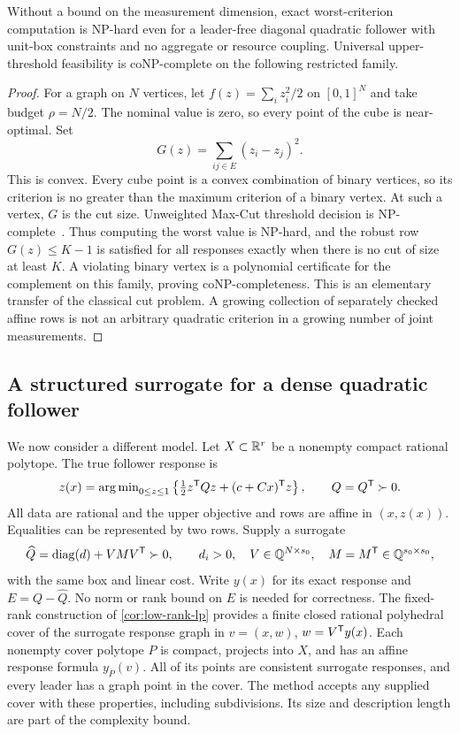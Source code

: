 \begin{proposition}
\label{prop:robust-measurement-hardness}
Without a bound on the measurement dimension, exact worst-criterion
computation is NP-hard even for a leader-free diagonal quadratic
follower with unit-box constraints and no aggregate or resource
coupling. Universal upper-threshold feasibility is coNP-complete on
the following restricted family.
\end{proposition}
\begin{proof}
For a graph on $N$ vertices, let $f(z)=\sum_i z_i^2/2$ on $[0,1]^N$
and take budget $\rho=N/2$. The nominal value is zero, so every point
of the cube is near-optimal. Set
\[
                         G(z)=\sum_{ij\in E}(z_i-z_j)^2.
\]
This is convex. Every cube point is a convex combination of binary
vertices, so its criterion is no greater than the maximum criterion of
a binary vertex. At such a vertex, $G$ is the cut size. Unweighted
Max-Cut threshold decision is NP-complete~\cite{GareyJohnsonStockmeyer1976}.
Thus computing the worst value is NP-hard, and the robust row
$G(z)\le K-1$ is satisfied for all responses exactly when there is no
cut of size at least $K$. A violating binary vertex is a polynomial
certificate for the complement on this family, proving coNP-completeness.
This is an elementary transfer of the classical cut problem. A growing
collection of separately checked affine rows is not an arbitrary
quadratic criterion in a growing number of joint measurements.
\end{proof}

\subsection{A structured surrogate for a dense quadratic follower}
\label{subsec:screening-model}

We now consider a different model. Let $X\subset\mathbb R^r$ be a nonempty
compact rational polytope. The true follower response is
\begin{equation}\label{eq:dense-screening-follower}
 z(x)=\operatorname{arg\,min}_{0\le z\le1}
          \left\{\tfrac12 z^{\mathsf T} Qz+(c+Cx)^{\mathsf T} z\right\},
                      \qquad Q=Q^{\mathsf T}\succ0.
\end{equation}
All data are rational and the upper objective and rows are affine in
$(x,z(x))$. Equalities can be represented by two rows. Supply a surrogate
\[
 \widehat Q=\operatorname{diag}(d)+VMV^{\mathsf T}\succ0,\qquad
 d_i>0,\quad V\in\mathbb Q^{N\times s_0},\quad M=M^{\mathsf T}\in\mathbb Q^{s_0\times s_0},
\]
with the same box and linear cost. Write $y(x)$ for its exact response
and $E=Q-\widehat Q$. No norm or rank bound on $E$ is needed for
correctness. The fixed-rank construction of \cref{cor:low-rank-lp}
provides a finite closed rational polyhedral cover of the surrogate
response graph in $v=(x,w)$, $w=V^{\mathsf T} y(x)$. Each nonempty cover
polytope $P$ is compact, projects into $X$, and has an affine response
formula $y_P(v)$. All of its points are consistent surrogate responses,
and every leader has a graph point in the cover. The method accepts any
supplied cover with these properties, including subdivisions. Its size
and description length are part of the complexity bound.

